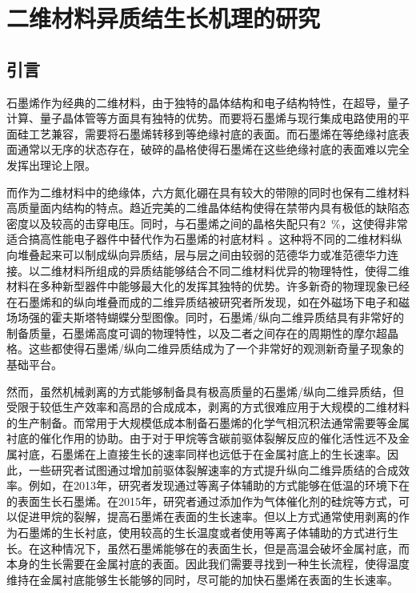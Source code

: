\chapter{二维材料异质结生长机理的研究}
\section{引言}
石墨烯作为经典的二维材料，由于独特的晶体结构和电子结构特性，在超导，量子计算、量子晶体管等方面具有独特的优势。而要将石墨烯与现行集成电路使用的平面硅工艺兼容，需要将石墨烯转移到等绝缘衬底的表面。而石墨烯在等绝缘衬底表面通常以无序的状态存在，破碎的晶格使得石墨烯在这些绝缘衬底的表面难以完全发挥出理论上限。

而作为二维材料中的绝缘体，六方氮化硼在具有较大的带隙的同时也保有二维材料高质量面内结构的特点。趋近完美的二维晶体结构使得在禁带内具有极低的缺陷态密度以及较高的击穿电压。同时，与石墨烯之间的晶格失配只有\SI{2}{\percent}，这使得非常适合搞高性能电子器件中替代作为石墨烯的衬底材料 。这种将不同的二维材料纵向堆叠起来可以制成纵向异质结，层与层之间由较弱的范德华力或准范德华力连接。以二维材料所组成的异质结能够结合不同二维材料优异的物理特性，使得二维材料在多种新型器件中能够最大化的发挥其独特的优势。许多新奇的物理现象已经在石墨烯和的纵向堆叠而成的二维异质结被研究者所发现，如在外磁场下电子和磁场场强的霍夫斯塔特蝴蝶分型图像。同时，石墨烯/纵向二维异质结具有非常好的制备质量，石墨烯高度可调的物理特性，以及二者之间存在的周期性的摩尔超晶格。这些都使得石墨烯/纵向二维异质结成为了一个非常好的观测新奇量子现象的基础平台。

然而，虽然机械剥离的方式能够制备具有极高质量的石墨烯/纵向二维异质结，但受限于较低生产效率和高昂的合成成本，剥离的方式很难应用于大规模的二维材料的生产制备。而常用于大规模低成本制备石墨烯的化学气相沉积法通常需要等金属衬底的催化作用的协助。由于对于甲烷等含碳前驱体裂解反应的催化活性远不及金属衬底，石墨烯在上直接生长的速率同样也远低于在金属衬底上的生长速率。因此，一些研究者试图通过增加前驱体裂解速率的方式提升纵向二维异质结的合成效率。例如，在2013年，研究者发现通过等离子体辅助的方式能够在低温的环境下在的表面生长石墨烯。在2015年，研究者通过添加作为气体催化剂的硅烷等方式，可以促进甲烷的裂解，提高石墨烯在表面的生长速率。但以上方式通常使用剥离的作为石墨烯的生长衬底，使用较高的生长温度或者使用等离子体辅助的方式进行生长。在这种情况下，虽然石墨烯能够在的表面生长，但是高温会破坏金属衬底，而本身的生长需要在金属衬底的表面。因此我们需要寻找到一种生长流程，使得温度维持在金属衬底能够生长能够的同时，尽可能的加快石墨烯在表面的生长速率。

